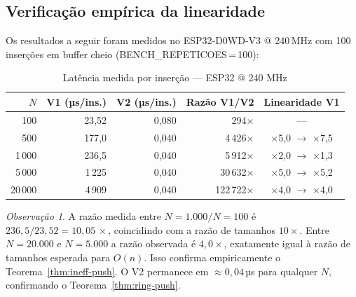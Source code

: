 \documentclass[12pt, a4paper]{article}
\theoremstyle{definition}
\theoremstyle{remark}
\newtheorem{observacao}{Observação}
\begin{document}
\subsection{Verificação empírica da linearidade}

Os resultados a seguir foram medidos no ESP32-D0WD-V3 @ 240\,MHz com
100 inserções em buffer cheio (BENCH\_REPETICOES\,=\,100):

\begin{table}[H]
  \centering
  \caption{Latência medida por inserção — ESP32 @ 240 MHz}
  \label{tab:bench}
  \begin{tabular}{rrrrc}
    \toprule
    $N$ & V1 (µs/ins.) & V2 (µs/ins.) & Razão V1/V2 & Linearidade V1 \\
    \midrule
    100   & 23{,}52  & 0{,}080 & 294×    & —         \\
    500   & 177{,}0  & 0{,}040 & 4\,426× & ×5,0 $\to$ ×7,5 \\
    1\,000 & 236{,}5 & 0{,}040 & 5\,912× & ×2,0 $\to$ ×1,3 \\
    5\,000 & 1\,225  & 0{,}040 & 30\,632× & ×5,0 $\to$ ×5,2 \\
    20\,000 & 4\,909 & 0{,}040 & 122\,722× & ×4,0 $\to$ ×4,0 \\
    \bottomrule
  \end{tabular}
\end{table}

\begin{observacao}
  A razão medida entre $N=1.000/N=100$ é $236{,}5 / 23{,}52 = 10{,}05\,\times$,
  coincidindo com a razão de tamanhos $10\times$. Entre $N=20.000$ e $N=5.000$
  a razão observada é $4{,}0\times$, exatamente igual à razão de tamanhos
  esperada para $O(n)$. Isso confirma empiricamente o Teorema~\ref{thm:ineff-push}.
  O V2 permanece em $\approx 0{,}04$\,µs para qualquer $N$, confirmando o
  Teorema~\ref{thm:ring-push}.
\end{observacao}
\end{document}
